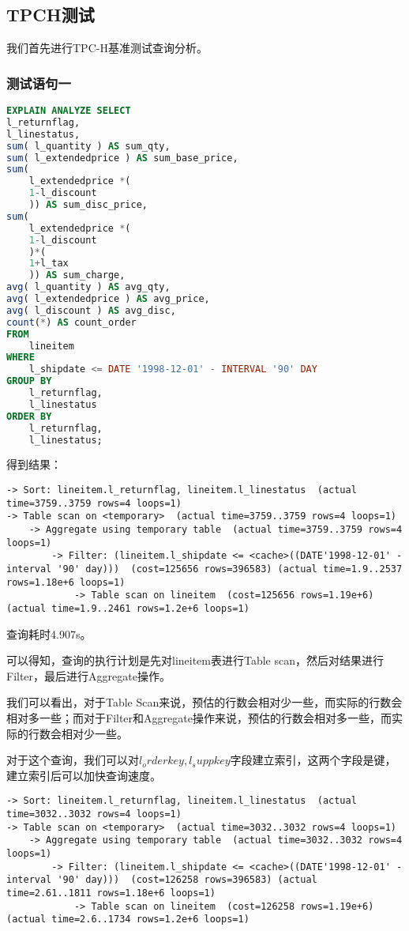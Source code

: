 \documentclass{article}
\begin{document}
\subsection{TPCH测试}

我们首先进行TPC-H基准测试查询分析。

\subsubsection{测试语句一}

\begin{lstlisting}[language=sql]
EXPLAIN ANALYZE SELECT
l_returnflag,
l_linestatus,
sum( l_quantity ) AS sum_qty,
sum( l_extendedprice ) AS sum_base_price,
sum(
    l_extendedprice *(
    1-l_discount 
    )) AS sum_disc_price,
sum(
    l_extendedprice *(
    1-l_discount 
    )*(
    1+l_tax 
    )) AS sum_charge,
avg( l_quantity ) AS avg_qty,
avg( l_extendedprice ) AS avg_price,
avg( l_discount ) AS avg_disc,
count(*) AS count_order 
FROM
    lineitem 
WHERE
    l_shipdate <= DATE '1998-12-01' - INTERVAL '90' DAY 
GROUP BY
    l_returnflag,
    l_linestatus 
ORDER BY
    l_returnflag,
    l_linestatus;
\end{lstlisting}

得到结果：

\begin{lstlisting}
-> Sort: lineitem.l_returnflag, lineitem.l_linestatus  (actual time=3759..3759 rows=4 loops=1)
-> Table scan on <temporary>  (actual time=3759..3759 rows=4 loops=1)
    -> Aggregate using temporary table  (actual time=3759..3759 rows=4 loops=1)
        -> Filter: (lineitem.l_shipdate <= <cache>((DATE'1998-12-01' - interval '90' day)))  (cost=125656 rows=396583) (actual time=1.9..2537 rows=1.18e+6 loops=1)
            -> Table scan on lineitem  (cost=125656 rows=1.19e+6) (actual time=1.9..2461 rows=1.2e+6 loops=1)
\end{lstlisting}

查询耗时4.907s。

可以得知，查询的执行计划是先对lineitem表进行Table scan，然后对结果进行Filter，最后进行Aggregate操作。

我们可以看出，对于Table Scan来说，预估的行数会相对少一些，而实际的行数会相对多一些；而对于Filter和Aggregate操作来说，预估的行数会相对多一些，而实际的行数会相对少一些。

对于这个查询，我们可以对$l_orderkey,l_suppkey$字段建立索引，这两个字段是键，建立索引后可以加快查询速度。

\begin{lstlisting}
-> Sort: lineitem.l_returnflag, lineitem.l_linestatus  (actual time=3032..3032 rows=4 loops=1)
-> Table scan on <temporary>  (actual time=3032..3032 rows=4 loops=1)
    -> Aggregate using temporary table  (actual time=3032..3032 rows=4 loops=1)
        -> Filter: (lineitem.l_shipdate <= <cache>((DATE'1998-12-01' - interval '90' day)))  (cost=126258 rows=396583) (actual time=2.61..1811 rows=1.18e+6 loops=1)
            -> Table scan on lineitem  (cost=126258 rows=1.19e+6) (actual time=2.6..1734 rows=1.2e+6 loops=1)
\end{lstlisting}
\end{document}
